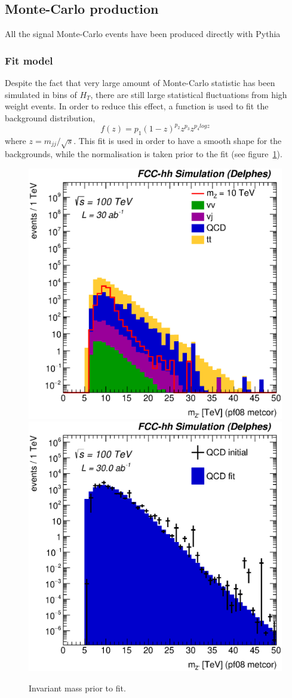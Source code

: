 \documentclass{cernrep}
\newcommand*{\hht}{\ensuremath{H_{\ensuremath{T}}}}
\begin{document}
\subsection{Monte-Carlo production}
\label{subsec:mcprod}

All the signal Monte-Carlo events have been produced directly with Pythia 

\subsubsection{Fit model}
Despite the fact that very large amount of Monte-Carlo statistic has been simulated in bins of $\hht$, there are still large statistical fluctuations from high weight events.
In order to reduce this effect, a function is used to fit the background distribution,
\begin{equation}
f(z)=p_1(1-z)^{p_2}z^{p_3}z^{p_{4}logz}
\end{equation}
where $z=m_{jj}/\sqrt{s}$. This fit is used in order to have a smooth shape for the backgrounds, while the normalisation is taken prior to the fit (see figure~\ref{fig:hadronicresonances_nofit}).

\begin{figure}[!htb]\centering
\includegraphics[width=0.45\columnwidth]{Fig/Zptt/Mj1j2_pf08_MetCorr_sel8_nostack_log.eps}
\includegraphics[width=0.45\columnwidth]{Fig/Zptt/Zptt_QCD_sel8_Mj1j2_pf08_MetCorr_fit.eps}
\caption{Invariant mass prior to fit.}
\label{fig:hadronicresonances_nofit}
\end{figure}
\end{document}

